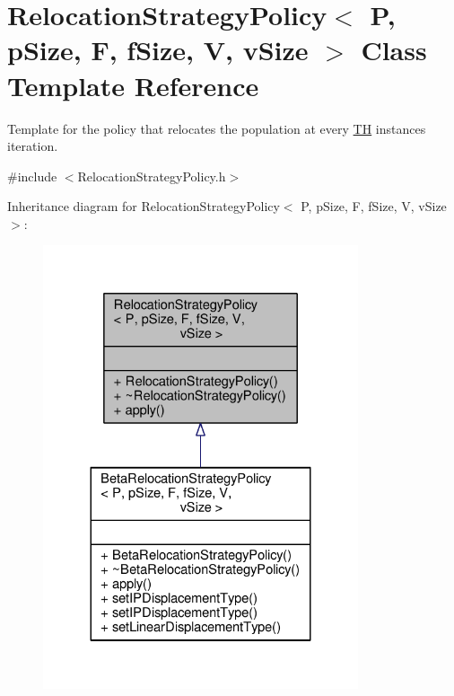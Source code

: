 \hypertarget{classRelocationStrategyPolicy}{}\section{Relocation\+Strategy\+Policy$<$ P, p\+Size, F, f\+Size, V, v\+Size $>$ Class Template Reference}
\label{classRelocationStrategyPolicy}


Template for the policy that relocates the population at every \hyperlink{classTH}{TH} instance\textquotesingle{}s iteration.  




{\ttfamily \#include $<$Relocation\+Strategy\+Policy.\+h$>$}



Inheritance diagram for Relocation\+Strategy\+Policy$<$ P, p\+Size, F, f\+Size, V, v\+Size $>$\+:\nopagebreak
\begin{figure}[H]
\begin{center}
\leavevmode
\includegraphics[width=263pt]{classRelocationStrategyPolicy__inherit__graph}
\end{center}
\end{figure}


